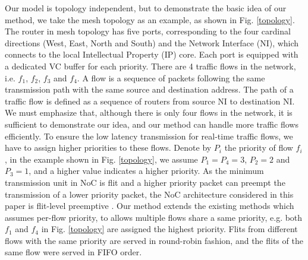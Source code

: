 \documentclass[10pt,journal]{IEEEtran}
\begin{document}
Our model is topology independent, but to demonstrate the basic idea of our method, we take the mesh topology as an example, as shown in Fig. \ref{topology}. The router in mesh topology has five ports, corresponding to the four cardinal directions (West, East, North and South) and the Network Interface (NI), which connects to the local Intellectual Property (IP) core. Each port is equipped with a dedicated VC buffer for each priority. There are 4 traffic flows in the network, i.e. $f_1$, $f_2$, $f_3$ and $f_4$. A flow is a sequence of packets following the same transmission path with the same source and destination address. The path of a traffic flow is defined as a sequence of routers from source NI to destination NI. We must emphasize that, although there is only four flows in the network, it is sufficient to demonstrate our idea, and our method can handle more traffic flows efficiently. To ensure the low latency transmission for real-time traffic flows, we have to assign higher priorities to these flows. Denote by $P_i$ the priority of flow $f_i$, in the example shown in Fig. \ref{topology}, we assume $P_1=P_4=3$, $P_2=2$ and $P_3=1$, and a higher value indicates a higher priority. As the minimum transmission unit in NoC is flit and a higher priority packet can preempt the transmission of a lower priority packet, the NoC architecture considered in this paper is flit-level preemptive \cite{Lee:2003:RWC:846077.846083}. Our method extends the existing methods \cite{73}\cite{Qian489900} which assumes per-flow priority, to allows multiple flows share a same priority, e.g. both $f_1$ and $f_4$ in Fig. \ref{topology} are assigned the highest priority. Flits from different flows with the same priority are served in round-robin fashion, and the flits of the same flow were served in FIFO order.
\end{document}

